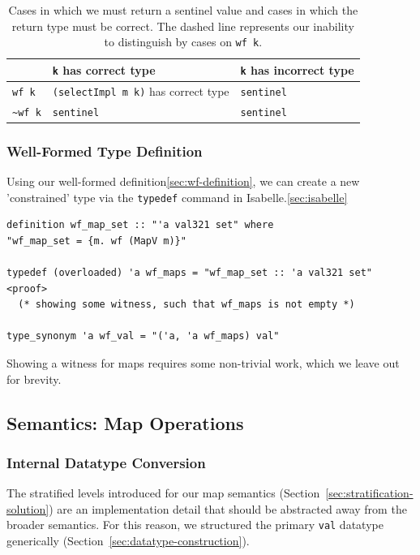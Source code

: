\documentclass[11pt]{article}
\begin{document}
\begin{table}[t]
\begin{tabular}{|l|l|l|}
  \hline
                 & \texttt{k} has correct type & \texttt{k} has incorrect type \\ \hline
  \texttt{wf k}  & \texttt{(selectImpl m k)} has correct type & \texttt{sentinel}  \\ \hdashline
\texttt{\textasciitilde wf k}  & \texttt{sentinel}    & \texttt{sentinel}  \\ \hline
\end{tabular}

  \caption{Cases in which we must return a sentinel value and cases in which the return type must be correct.
  The dashed line represents our inability to distinguish by cases on \texttt{wf k}.}
  \label{tab:sentinel-cases}
\end{table}

\subsubsection{Well-Formed Type Definition}
\label{sec:constrained-types}

Using our well-formed definition\ref{sec:wf-definition},
we can create a new 'constrained' type
via the \texttt{typedef} command in Isabelle.\ref{sec:isabelle}

\begin{verbatim}
definition wf_map_set :: "'a val321 set" where
"wf_map_set = {m. wf (MapV m)}"

typedef (overloaded) 'a wf_maps = "wf_map_set :: 'a val321 set"
<proof>
  (* showing some witness, such that wf_maps is not empty *)

type_synonym 'a wf_val = "('a, 'a wf_maps) val"
\end{verbatim}

Showing a witness for maps requires some non-trivial work,
which we leave out for brevity.


\subsection{Semantics: Map Operations}
\subsubsection{Internal Datatype Conversion}
\label{sec:conversion-internal}

The stratified levels introduced for our map semantics (Section~\ref{sec:stratification-solution}) are an implementation detail that should be abstracted away from the broader semantics.
For this reason, we structured the primary \texttt{val} datatype generically (Section~\ref{sec:datatype-construction}).
\end{document}
